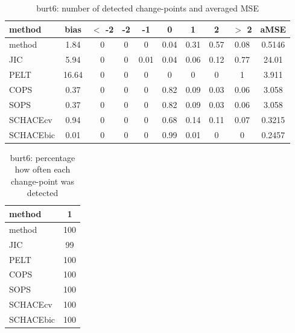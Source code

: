 \begin{table}[ht]
\centering
\begin{tabular}{l|c|ccccccc|c}
  \hline
method & bias & $<$ -2 & -2 & -1 & 0 & 1 & 2 & $>$ 2 & aMSE \\ 
  \hline
method &  1.84 &     0 &     0 &     0 &  0.04 &  0.31 &  0.57 &  0.08 & 0.5146 \\ 
  JIC &  5.94 &     0 &     0 &  0.01 &  0.04 &  0.06 &  0.12 &  0.77 & 24.01 \\ 
  PELT & 16.64 &     0 &     0 &     0 &     0 &     0 &     0 &     1 & 3.911 \\ 
  COPS &  0.37 &     0 &     0 &     0 &  0.82 &  0.09 &  0.03 &  0.06 & 3.058 \\ 
  SOPS &  0.37 &     0 &     0 &     0 &  0.82 &  0.09 &  0.03 &  0.06 & 3.058 \\ 
  SCHACEcv &  0.94 &     0 &     0 &     0 &  0.68 &  0.14 &  0.11 &  0.07 & 0.3215 \\ 
  SCHACEbic &  0.01 &     0 &     0 &     0 &  0.99 &  0.01 &     0 &     0 & 0.2457 \\ 
   \hline
\end{tabular}
\caption{burt6: number of detected change-points and averaged MSE} 
\label{tab:burt6Njumps}
\end{table}
\begin{table}[ht]
\centering
\begin{tabular}{l|c}
  \hline
method & 1 \\ 
  \hline
method &    100 \\ 
  JIC &     99 \\ 
  PELT &    100 \\ 
  COPS &    100 \\ 
  SOPS &    100 \\ 
  SCHACEcv &    100 \\ 
  SCHACEbic &    100 \\ 
   \hline
\end{tabular}
\caption{burt6: percentage how often each change-point was detected} 
\label{tab:burt6Detections}
\end{table}
